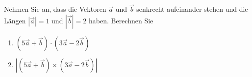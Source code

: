 \begin{ExerciseBlock}
Nehmen Sie an, dass die Vektoren $\vec{a}$ und $\vec{b}$ senkrecht aufeinander stehen und die Längen  $|\vec{a}| = 1$ und $|\vec{b}| = 2$ haben. Berechnen Sie
\begin{enumerate}[label=\alph*)]
	\item $\left( 5 \vec{a} + \vec{b} \right) \cdot \left( 3 \vec{a} - 2 \vec{b} \right)$
	\item $\left| \left( 5 \vec{a} + \vec{b} \right) \times \left( 3 \vec{a} - 2 \vec{b} \right) \right|$
\end{enumerate} 

\end{ExerciseBlock}
